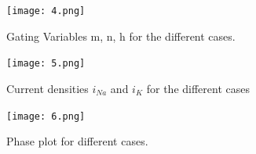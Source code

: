\documentclass{scrartcl}			%
\begin{document}
\begin{figure}[hbpt!]					%
	\begin{flushleft}
		\hspace*{-0.1in}
		\texttt{[image: 4.png]}
		\captionsetup{width=\linewidth}  %
		\caption{Gating Variables m, n, h for the different cases.}
		\label{fig3} %
	\end{flushleft}
\end{figure}

\newpage
\begin{figure}[hbpt!]					%
	\begin{flushleft}
		\hspace*{-0.1in}
			\texttt{[image: 5.png]}
		\captionsetup{width=\linewidth}  %
		\caption{Current densities $i_{Na}$ and ${i_K}$ for the different cases}
		\label{fig5} %
	\end{flushleft}
\end{figure}

\begin{figure}[hbpt!]					%
	\begin{flushleft}
		\hspace*{-0.1in}
		\texttt{[image: 6.png]}
		\captionsetup{width=\linewidth}  %
		\caption{Phase plot for different cases.}
		\label{fig6} %
	\end{flushleft}
\end{figure}
\end{document}
